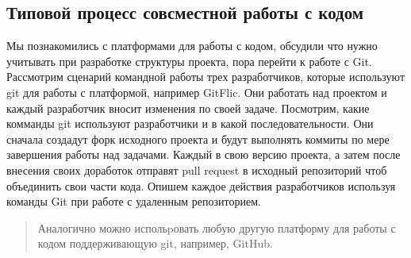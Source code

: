\documentclass[letterpaper,10pt,russian]{sphinxmanual}
\begin{document}
\subsection{Типовой процесс совсместной работы с кодом}
\label{\detokenize{educational_materials/team_work_on_a_gitflic/content:id1}}
\sphinxAtStartPar
Мы познакомились с платформами для работы с кодом, обсудили что нужно учитывать при разработке структуры проекта, пора перейти к работе с Git. Рассмотрим сценарий командной работы трех разработчиков, которые используют git для работы с платформой, например GitFlic. Они работать над проектом и каждый разработчик вносит изменения по своей задаче. Посмотрим, какие комманды git используют разработчики и в какой последовательности. Они сначала создадут форк исходного проекта и будут выполнять коммиты по мере завершения работы над задачами. Каждый в свою версию проекта, а затем после внесения своих доработок отправят pull request в исходный репозиторий чтоб объединить свои части кода.    Опишем каждое действия разработчиков используя команды Git при работе с удаленным репозиторием.
\begin{quote}

\sphinxAtStartPar
Аналогично можно испольpовать любую другую платформу для работы с кодом поддерживающую git, например, GitHub.
\end{quote}
\end{document}
